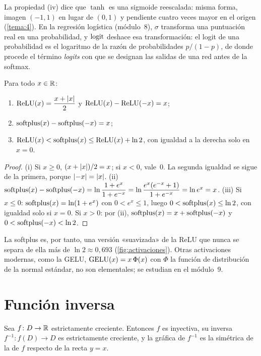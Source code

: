 La propiedad (iv) dice que $\tanh$ es una sigmoide reescalada: misma forma, imagen $(-1,1)$ en lugar de $(0,1)$ y pendiente cuatro veces mayor en el origen (\cref{tema:4}). En la regresión logística (módulo~8), $\sigma$ transforma una puntuación real en una probabilidad, y $\operatorname{logit}$ deshace esa transformación: el logit de una probabilidad es el logaritmo de la razón de probabilidades $p/(1-p)$, de donde procede el término \emph{logits} con que se designan las salidas de una red antes de la softmax.

\begin{proposicion}\label{prop:relu}
Para todo $x\in\mathbb{R}$:
\begin{enumerate}
  \item $\operatorname{ReLU}(x)=\dfrac{x+\lvert x\rvert}{2}$ y $\operatorname{ReLU}(x)-\operatorname{ReLU}(-x)=x$;
  \item $\operatorname{softplus}(x)-\operatorname{softplus}(-x)=x$;
  \item $\operatorname{ReLU}(x)<\operatorname{softplus}(x)\le\operatorname{ReLU}(x)+\ln 2$, con igualdad a la derecha solo en $x=0$.
\end{enumerate}
\end{proposicion}

\begin{proof}
(i) Si $x\ge0$, $(x+\lvert x\rvert)/2=x$; si $x<0$, vale~$0$. La segunda igualdad se sigue de la primera, porque $\lvert-x\rvert=\lvert x\rvert$. (ii) $\operatorname{softplus}(x)-\operatorname{softplus}(-x)=\ln\dfrac{1+e^{x}}{1+e^{-x}}=\ln\dfrac{e^{x}(e^{-x}+1)}{1+e^{-x}}=\ln e^{x}=x$. (iii) Si $x\le0$: $\operatorname{softplus}(x)=\ln(1+e^{x})$ con $0<e^{x}\le1$, luego $0<\operatorname{softplus}(x)\le\ln2$, con igualdad solo si $x=0$. Si $x>0$: por (ii), $\operatorname{softplus}(x)=x+\operatorname{softplus}(-x)$ y $0<\operatorname{softplus}(-x)<\ln 2$.
\end{proof}

La softplus es, por tanto, una versión «suavizada» de la ReLU que nunca se separa de ella más de $\ln 2\approx0{,}693$ (\cref{fig:activaciones}). Otras activaciones modernas, como la GELU, $\operatorname{GELU}(x)=x\,\Phi(x)$ con $\Phi$ la función de distribución de la normal estándar, no son elementales; se estudian en el módulo~9.

\section{Función inversa}

\begin{proposicion}\label{prop:inversa-monotona}
Sea $f\colon D\to\mathbb{R}$ estrictamente creciente. Entonces $f$ es inyectiva, su inversa $f^{-1}\colon f(D)\to D$ es estrictamente creciente, y la gráfica de $f^{-1}$ es la simétrica de la de $f$ respecto de la recta $y=x$.
\end{proposicion}

